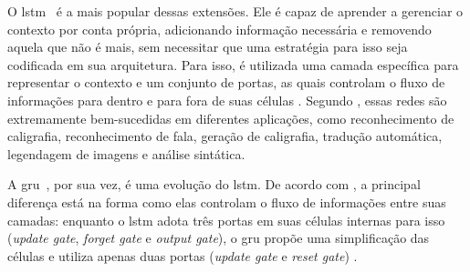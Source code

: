 O \acrshort{lstm}~\cite{hochreiter-1997-lstm} é a mais popular dessas extensões. Ele é capaz de aprender a gerenciar o contexto por conta própria, adicionando informação necessária e removendo aquela que não é mais, sem necessitar que uma estratégia para isso seja codificada em sua arquitetura. Para isso, é utilizada uma camada específica para representar o contexto e um conjunto de portas, as quais controlam o fluxo de informações para dentro e para fora de suas células \cite{jurafsky-2022-speech-lang-processing}.
Segundo , essas redes são extremamente bem-sucedidas em diferentes aplicações, como reconhecimento de caligrafia, reconhecimento de fala, geração de caligrafia, tradução automática, legendagem de imagens e análise sintática.



A \acrshort{gru}~\cite{cho-2014-gru}, por sua vez, é uma evolução do \acrshort{lstm}. De acordo com , a principal diferença está na forma como elas controlam o fluxo de informações entre suas camadas: enquanto o \acrshort{lstm} adota três portas em suas células internas para isso (\textit{update gate}, \textit{forget gate} e \textit{output gate}), o \acrshort{gru} propõe uma simplificação das células e utiliza apenas duas portas (\textit{update gate} e \textit{reset gate}) \cite{ravanelli-2018-li-gru,goodfellow-2016-deep-learning}.

